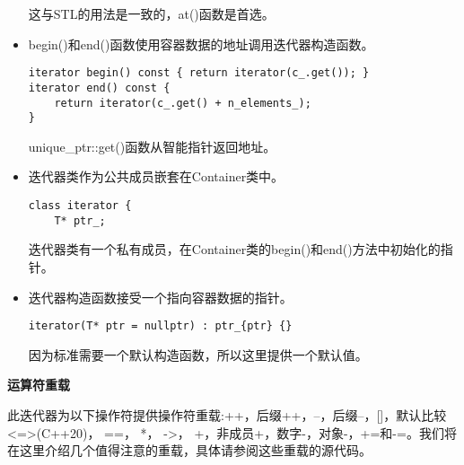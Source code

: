 \begin{itemize}
这与STL的用法是一致的，at()函数是首选。

\item 
begin()和end()函数使用容器数据的地址调用迭代器构造函数。

\begin{lstlisting}[style=styleCXX]
iterator begin() const { return iterator(c_.get()); }
iterator end() const {
	return iterator(c_.get() + n_elements_);
}
\end{lstlisting}

unique\_ptr::get()函数从智能指针返回地址。

\item 
迭代器类作为公共成员嵌套在Container类中。

\begin{lstlisting}[style=styleCXX]
class iterator {
	T* ptr_;
\end{lstlisting}

迭代器类有一个私有成员，在Container类的begin()和end()方法中初始化的指针。

\item 
迭代器构造函数接受一个指向容器数据的指针。

\begin{lstlisting}[style=styleCXX]
iterator(T* ptr = nullptr) : ptr_{ptr} {}
\end{lstlisting}

因为标准需要一个默认构造函数，所以这里提供一个默认值。
\end{itemize}

\noindent
\textbf{运算符重载}

此迭代器为以下操作符提供操作符重载:++，后缀++，--，后缀--，[]，默认比较<=>(C++20)， ==， *， ->， +，非成员+，数字-，对象-，+=和-=。我们将在这里介绍几个值得注意的重载，具体请参阅这些重载的源代码。


